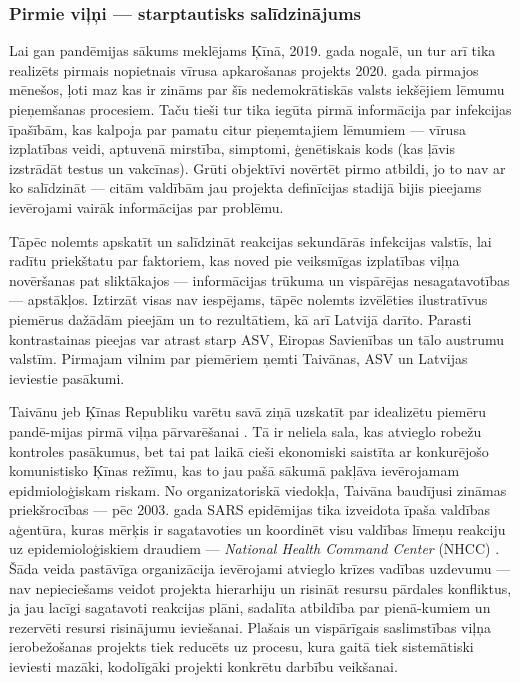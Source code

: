 \documentclass[12pt, a4paper]{article}
\numberwithin{equation}{section} %
\begin{document}
\subsubsection{Pirmie viļņi --- starptautisks salīdzinājums}

Lai gan pandēmijas sākums meklējams Ķīnā, 2019. gada nogalē, un tur arī tika realizēts pirmais nopietnais vīrusa apkarošanas projekts 2020. gada pirmajos mēnešos, ļoti maz kas ir zināms par šīs nedemokrātiskās valsts iekšējiem lēmumu pieņemšanas procesiem. Taču tieši tur tika iegūta pirmā informācija par infekcijas īpašībām, kas kalpoja par pamatu citur pieņemtajiem lēmumiem --- vīrusa izplatības veidi, aptuvenā mirstība, simptomi, ģenētiskais kods (kas ļāvis izstrādāt testus un vakcīnas). Grūti objektīvi novērtēt pirmo atbildi, jo to nav ar ko salīdzināt --- citām valdībām jau projekta definīcijas stadijā bijis pieejams ievērojami vairāk informācijas par problēmu. 

Tāpēc nolemts apskatīt un salīdzināt reakcijas sekundārās infekcijas valstīs, lai radītu priekštatu par faktoriem, kas noved pie veiksmīgas izplatības viļņa novēršanas pat sliktākajos --- informācijas trūkuma un vispārējas nesagatavotības --- apstākļos. Iztirzāt visas nav iespējams, tāpēc nolemts izvēlēties ilustratīvus piemērus dažādām pieejām un to rezultātiem, kā arī Latvijā darīto. Parasti kontrastainas pieejas var atrast starp ASV, Eiropas Savienības un tālo austrumu valstīm. Pirmajam vilnim par piemēriem ņemti Taivānas, ASV un Latvijas ieviestie pasākumi.

Taivānu jeb Ķīnas Republiku varētu savā ziņā uzskatīt par idealizētu piemēru pandē-mijas pirmā viļņa pārvarēšanai \cite{Taiwan_wave_1}. Tā ir neliela sala, kas atvieglo robežu kontroles pasākumus, bet tai pat laikā cieši ekonomiski saistīta ar konkurējošo komunistisko Ķīnas režīmu, kas to jau pašā sākumā pakļāva ievērojamam epidmioloģiskam riskam. No organizatoriskā viedokļa, Taivāna baudījusi zināmas priekšrocības --- pēc 2003. gada SARS epidēmijas tika izveidota īpaša valdības aģentūra, kuras mērķis ir sagatavoties un koordinēt visu valdības līmeņu reakciju uz epidemioloģiskiem draudiem --- \textit{National Health Command Center} (NHCC) \cite{wang2020response}. Šāda veida pastāvīga organizācija ievērojami atvieglo krīzes vadības uzdevumu --- nav nepieciešams veidot projekta hierarhiju un risināt resursu pārdales konfliktus, ja jau lacīgi sagatavoti reakcijas plāni, sadalīta atbildība par pienā-kumiem un rezervēti resursi risinājumu ieviešanai. Plašais un vispārīgais saslimstības viļņa ierobežošanas projekts tiek reducēts uz procesu, kura gaitā tiek sistemātiski ieviesti mazāki, kodolīgāki projekti konkrētu darbību veikšanai. 
\end{document}
